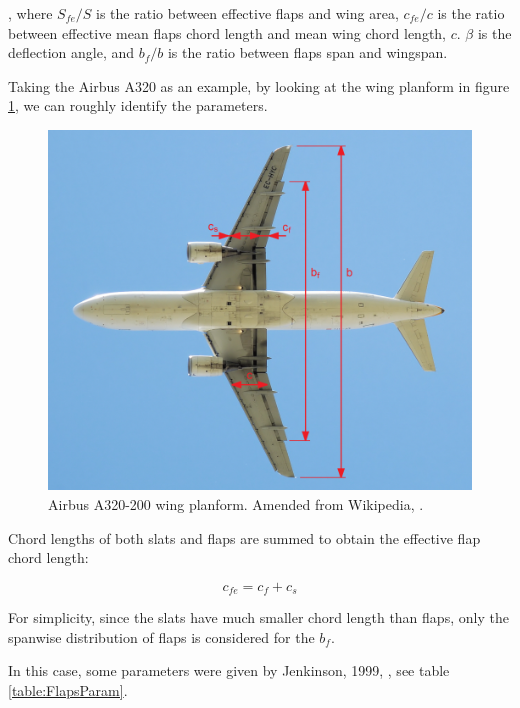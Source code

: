 \documentclass[english]{kththesis}
\begin{document}
, where $S_{fe}/S$ is the ratio between effective flaps and wing area, $c_{fe}/c$ is the ratio between effective mean flaps chord length and mean wing chord length, $c$. $\beta$ is the deflection angle, and $b_{f}/b$ is the ratio between flaps span and wingspan.

Taking the Airbus A320 as an example, by looking at the wing planform in figure \ref{fig:A320Planform}, we can roughly identify the parameters.

\begin{figure}[hb]
    \centering
    \includegraphics[width=1\textwidth]{Epictures/Iberia_a320-200_planform_Arrows.png}
    \caption{Airbus A320-200 wing planform. Amended from Wikipedia, \cite{WikiA320-2021}.}
    \label{fig:A320Planform}
\end{figure}


Chord lengths of both slats and flaps are summed to obtain the effective flap chord length:

\begin{equation}
\label{eq:cfe}
c_{fe} = c_f + c_s
\end{equation}

For simplicity, since the slats have much smaller chord length than flaps, only the spanwise distribution of flaps is considered for the $b_f$.

In this case, some parameters were given by Jenkinson, 1999, \cite{Jenkinson1999}, see table \ref{table:FlapsParam}.
\end{document}
